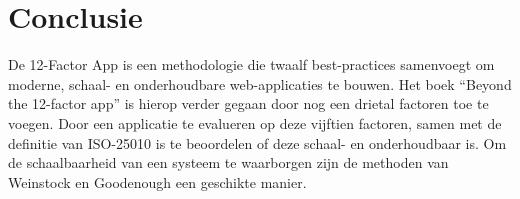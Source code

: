 \section{Conclusie}
De 12-Factor App is een methodologie die twaalf best-practices samenvoegt om moderne, schaal- en onderhoudbare web-applicaties te bouwen. Het boek \enquote{Beyond the 12-factor app} \parencite{Beyond12Factor} is hierop verder gegaan door nog een drietal factoren toe te voegen. Door een applicatie te evalueren op deze vijftien factoren, samen met de definitie van ISO-25010 \parencite{ISO25010} is te beoordelen of deze schaal- en onderhoudbaar is. Om de schaalbaarheid van een systeem te waarborgen zijn  de methoden van Weinstock en Goodenough \parencite{OnSystemScalability} een geschikte manier.